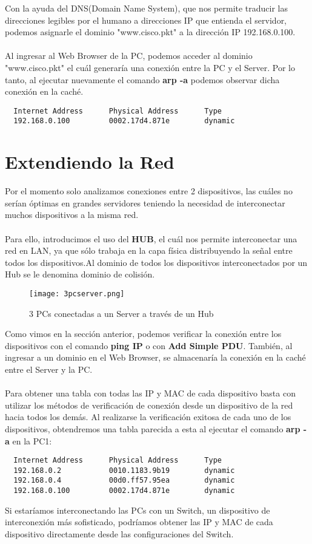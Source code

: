 \documentclass{article}
\begin{document}
Con la ayuda del DNS(Domain Name System), que nos permite traducir las direcciones legibles por el humano a direcciones IP que entienda el servidor, podemos asignarle el dominio "www.cisco.pkt" a la dirección IP 192.168.0.100.
\\\\
Al ingresar al Web Browser de la PC, podemos acceder al dominio "www.cisco.pkt" el cuál generaría una conexión entre la PC y el Server. Por lo tanto, al ejecutar nuevamente el comando \textbf{arp -a} podemos observar dicha conexión en la caché.
\begin{lstlisting}
  Internet Address      Physical Address      Type
  192.168.0.100         0002.17d4.871e        dynamic
\end{lstlisting}


\section{Extendiendo la Red}
Por el momento solo analizamos conexiones entre 2 dispositivos, las cuáles no serían óptimas en grandes servidores teniendo la necesidad de interconectar muchos dispositivos a la misma red.
\\\\
Para ello, introducimos el uso del \textbf{HUB}, el cuál nos permite interconectar una red en LAN, ya que sólo trabaja en la capa física distribuyendo la señal entre todos los dispositivos.Al dominio de todos los dispositivos interconectados por un Hub se le denomina dominio de colisión. 

\begin{figure}[H]
\centering
\texttt{[image: 3pcserver.png]}
\caption{\label{fig:3pcserver} 3 PCs conectadas a un Server a través de un Hub}
\end{figure}

Como vimos en la sección anterior, podemos verificar la conexión entre los dispositivos con el comando \textbf{ping {IP}} o con \textbf{Add Simple PDU}. También, al ingresar a un dominio en el Web Browser, se almacenaría la conexión en la caché entre el Server y la PC.
\\\\
Para obtener una tabla con todas las IP y MAC de cada dispositivo basta con utilizar los métodos de verificación de conexión desde un dispositivo de la red hacia todos los demás. Al realizarse la verificación exitosa de cada uno de los dispositivos, obtendremos una tabla parecida a esta al ejecutar el comando \textbf{arp -a} en la PC1:
\begin{lstlisting}
  Internet Address      Physical Address      Type
  192.168.0.2           0010.1183.9b19        dynamic
  192.168.0.4           00d0.ff57.95ea        dynamic
  192.168.0.100         0002.17d4.871e        dynamic
\end{lstlisting}
Si estaríamos interconectando las PCs con un Switch, un dispositivo de interconexión más sofisticado, podríamos obtener las IP y MAC de cada dispositivo directamente desde las configuraciones del Switch.
\end{document}
